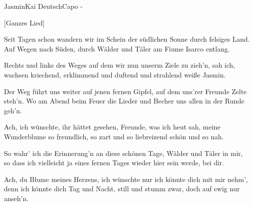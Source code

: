 \begin{song}{Jasmin}{Kai Deutsch}{Capo -}

[Ganzes Lied]

Seit Tagen schon wandern wir im Schein der südlichen
Sonne durch felsiges Land.
Auf Wegen nach Süden, durch Wälder und Täler am
Fiume Isarco entlang.

Rechts und links des Weges auf dem wir nun
unserm Ziele zu zieh’n, sah ich,
wachsen kriechend, erklimmend und duftend und
strahlend weiße Jasmin.

Der Weg führt uns weiter auf jenen fernen Gipfel, auf
dem uns’rer Freunde Zelte steh’n.
Wo am Abend beim Feuer die Lieder und Becher uns
allen in der Runde geh’n.

Ach, ich wünschte, ihr hättet gesehen,
Freunde, was ich heut sah,
meine Wunderblume so freundlich, so zart und so
liebreizend schön und so nah.

\newpage
{}
So wahr’ ich die Erinnerung’n an diese schönen Tage,
Wälder und Täler in mir,
so dass ich vielleicht ja eines fernen Tages
wieder hier sein werde, bei dir.

Ach, du Blume meines Herzens, ich wünschte nur
ich könnte dich mit mir nehm’,
denn ich könnte dich Tag und Nacht, still und stumm zwar, doch auf
ewig nur anseh’n.

\end{song}
